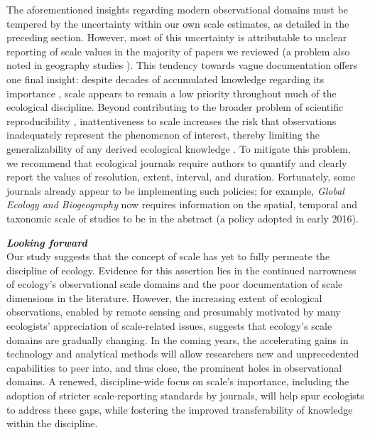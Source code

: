 \documentclass[12pt]{article}
\begin{document}
The aforementioned insights regarding modern observational domains must be tempered by the uncertainty within our own scale estimates, as detailed in the preceding section. However, most of this uncertainty is attributable to unclear reporting of scale values in the majority of papers we reviewed (a problem also noted in geography studies \cite{margulies_ambiguous_2016}). This tendency towards vague documentation offers one final insight: despite decades of accumulated knowledge regarding its importance \cite{levin_problem_1992, wiens_spatial_1989, chave_problem_2013, wheatley_factors_2009}, scale appears to remain a low priority throughout much of the ecological discipline. Beyond contributing to the broader problem of scientific reproducibility \cite{baker_1500_2016}, inattentiveness to scale increases the risk that observations inadequately represent the phenomenon of interest, thereby limiting the generalizability of any derived ecological knowledge \cite{margulies_ambiguous_2016, wheatley_factors_2009, wiens_spatial_1989}. To mitigate this problem, we recommend that ecological journals require authors to quantify and clearly report the values of resolution, extent, interval, and duration. Fortunately, some journals already appear to be implementing such policies; for example, \emph{Global Ecology and Biogeography} now requires information on the spatial, temporal and taxonomic scale of studies to be in the abstract (a policy adopted in early 2016).

\vspace{5pt}
\noindent \textbf{\emph{Looking forward}}\\
Our study suggests that the concept of scale has yet to fully permeate the discipline of ecology. Evidence for this assertion lies in the continued narrowness of ecology's observational scale domains and the poor documentation of scale dimensions in the literature. However, the increasing extent of ecological observations, enabled by remote sensing and presumably motivated by many ecologists' appreciation of scale-related issues, suggests that ecology's scale domains are gradually changing. In the coming years, the accelerating gains in technology and analytical methods will allow researchers new and unprecedented capabilities to peer into, and thus close, the prominent holes in observational domains. A renewed, discipline-wide focus on scale's importance, including the adoption of stricter scale-reporting standards by journals, will help spur ecologists to address these gaps, while fostering the improved transferability of knowledge within the discipline.  
\end{document}

